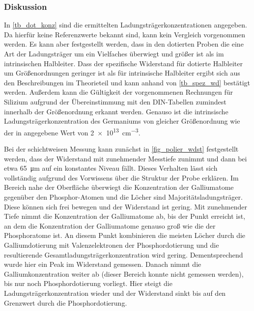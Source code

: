 \documentclass[
	a4paper,
	12pt,
	pagesize,
	ngerman
]{scrartcl}
\begin{document}
	\subsubsection{Diskussion}
	In \cref{tb_dot_konz} sind die ermittelten Ladungsträgerkonzentrationen angegeben.
	Da hierfür keine Referenzwerte bekannt sind, kann kein Vergleich vorgenommen werden.
	Es kann aber festgestellt werden, dass in den dotierten Proben die eine Art der Ladungsträger um ein Vielfaches überwiegt und größer ist als im intrinsischen Halbleiter.
	Dass der spezifische Widerstand für dotierte Halbleiter um Größenordnungen geringer ist als für intrinsische Halbleiter ergibt sich aus den Beschreibungen im Theorieteil und kann anhand von \cref{tb_spez_wd} bestätigt werden.
	Außerdem kann die Gültigkeit der vorgenommenen Rechnungen für Silizium aufgrund der Übereinstimmung mit den DIN-Tabellen zumindest innerhalb der Größenordnung erkannt werden.
	Genauso ist die intrinsische Ladungsträgerkonzentration des Germaniums von gleicher Größenordnung wie der in \cite{Kiel} angegebene Wert von \SI{2e13}{cm^{-3}}.

	Bei der schichtweisen Messung kann zunächst in \cref{fig_polier_wdst} festgestellt werden, dass der Widerstand mit zunehmender Messtiefe zunimmt und dann bei etwa \SI{65}{\micro \meter} auf ein konstantes Niveau fällt.
	Dieses Verhalten lässt sich vollständig aufgrund des Vorwissens über die Struktur der Probe erklären.
	Im Bereich nahe der Oberfläche überwiegt die Konzentration der Galliumatome gegenüber den Phosphor-Atomen und die Löcher sind Majoritätsladungsträger.
	Diese können sich frei bewegen und der Widerstand ist gering.
	Mit zunehmender Tiefe nimmt die Konzentration der Galliumatome ab, bis der Punkt erreicht ist, an dem die Konzentration der Galliumatome genauso groß wie die der Phosphoratome ist.
	An diesem Punkt kombinieren die meisten Löcher durch die Galliumdotierung mit Valenzelektronen der Phosphordotierung und die resultierende Gesamtladungsträgerkonzentration wird gering.
	Dementsprechend wurde hier ein Peak im Widerstand gemessen.
	Danach nimmt die Galliumkonzentration weiter ab (dieser Bereich konnte nicht gemessen werden), bis nur noch Phosphordotierung vorliegt.
	Hier steigt die Ladungsträgerkonzentration wieder und der Widerstand sinkt bis auf den Grenzwert durch die Phosphordotierung.
\end{document}
